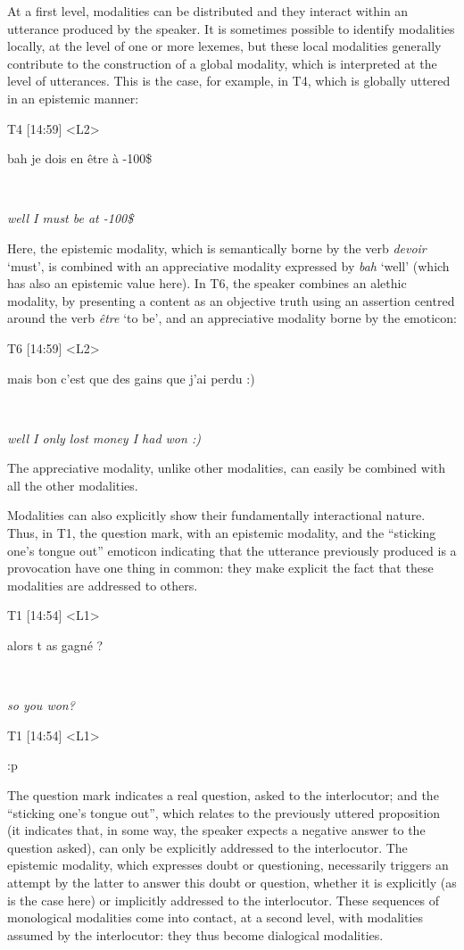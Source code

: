 \documentclass[output=paper]{langscibook}
\begin{document}
At a first level, modalities can be distributed and they interact within an utterance produced by the speaker. It is sometimes possible to identify modalities locally, at the level of one or more lexemes, but these local modalities generally contribute to the construction of a global modality, which is interpreted at the level of utterances. This is the case, for example, in T4, which is globally uttered in an epistemic manner: 

\ea 

\ttfamily
\parbox{30mm}{T4 [14:59] <L2>}bah je dois en être à -100\$\\
\parbox{30mm}{~}\textsl{well I must be at -100\$}

\z 

Here, the epistemic modality, which is semantically borne by the verb \textit{devoir} ‘must’, is combined with an appreciative modality expressed by \textit{bah} ‘well’ (which has also an epistemic value here). In T6, the speaker combines an alethic modality, by presenting a content as an objective truth using an assertion centred around the verb \textit{être} ‘to be’, and an appreciative modality borne by the emoticon: 

\ea 

\ttfamily
\parbox{30mm}{T6 [14:59] <L2>}mais bon c'est que des gains que j'ai perdu :)
\parbox{30mm}{~}\textsl{well I only lost money I had won :)}

\z 

The appreciative modality, unlike other modalities, can easily be combined with all the other modalities. 

Modalities can also explicitly show their fundamentally interactional nature. Thus, in T1, the question mark, with an epistemic modality, and the “sticking one's tongue out” emoticon indicating that the utterance previously produced is a provocation have one thing in common: they make explicit the fact that these modalities are addressed to others.

\ea 

\ttfamily
\parbox{30mm}{T1 [14:54] <L1>}alors t as gagné ?\\
\parbox{30mm}{~}\textsl{so you won?}\\
\parbox{30mm}{T1 [14:54] <L1>}:p\\

\z 

The question mark indicates a real question, asked to the interlocutor; and the “sticking one's tongue out”, which relates to the previously uttered proposition (it indicates that, in some way, the speaker expects a negative answer to the question asked), can only be explicitly addressed to the interlocutor. The epistemic modality, which expresses doubt or questioning, necessarily triggers an attempt by the latter to answer this doubt or question, whether it is explicitly (as is the case here) or implicitly addressed to the interlocutor. These sequences of monological modalities come into contact, at a second level, with modalities assumed by the interlocutor: they thus become dialogical modalities. 
\end{document}
